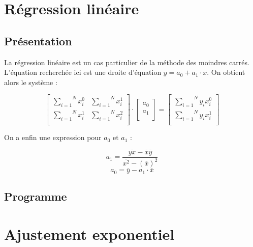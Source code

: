 \documentclass{report}
\begin{document}
    \section{Régression linéaire}
      \subsection{Présentation}
	La régression linéaire est un cas particulier de la méthode des moindres carrés. L'équation recherchée ici est une droite d'équation $y=a_{0} + a_{1} \cdot x$. On obtient alors le système :
	
	\begin{equation*}
	  \begin{bmatrix}
	    \overset{N}{\underset{i=1}{\sum}} x_{i}^{0} & \overset{N}{\underset{i=1}{\sum}} x_{i}^{1} \\
	    \overset{N}{\underset{i=1}{\sum}} x_{i}^{1} & \overset{N}{\underset{i=1}{\sum}} x_{i}^{2} \\
	  \end{bmatrix}
	  \cdot
	  \begin{bmatrix}
	    a_{0} \\
	    a_{1} \\
	  \end{bmatrix}
	  =
	  \begin{bmatrix}
	    \overset{N}{\underset{i=1}{\sum}} y_{i} x_{i}^{0} \\
	    \overset{N}{\underset{i=1}{\sum}} y_{i} x_{i}^{1} \\
	  \end{bmatrix}
	\end{equation*}
	
	On a enfin une expression pour $a_{0}$ et $a_{1}$ :
	
	\begin{displaymath}
	  a_{1} = \frac{\overline{yx}-\overline{x}\overline{y}}{\overline{x^{2}}-(\overline{x})^2}
	\end{displaymath}
	\vspace{0.1 cm}
	\begin{displaymath}
	  a_{0} = \overline{y} - a_{1} \cdot \overline{x}
	\end{displaymath}
      \subsection{Programme}
	
    \newpage
    \section{Ajustement exponentiel}
\end{document}
